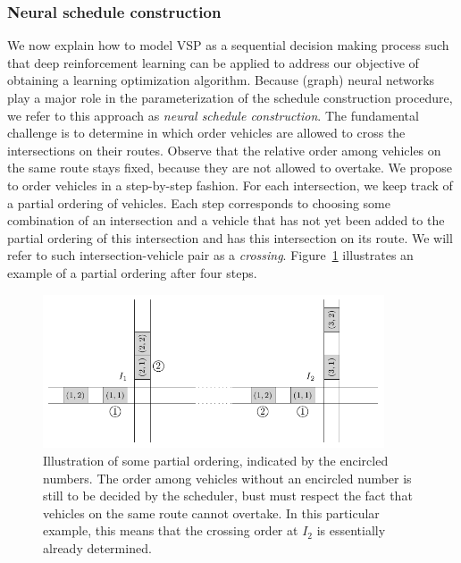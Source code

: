 \documentclass{article}
\theoremstyle{definition}
\theoremstyle{plain}
\begin{document}
\subsubsection{Neural schedule construction}
\label{sec:constructive_neural}

We now explain how to model VSP as a sequential decision making process such
that deep reinforcement learning can be applied to address our objective of
obtaining a learning optimization algorithm.
Because (graph) neural networks play a major role in the parameterization of the schedule construction procedure, we refer to this approach as \textit{neural schedule construction}.
The fundamental challenge is to determine in which order
vehicles are allowed to cross the intersections on their routes. Observe that
the relative order among vehicles on the same route stays fixed, because they
are not allowed to overtake.
%
We propose to order vehicles in a step-by-step fashion. For each intersection,
we keep track of a partial ordering of vehicles. Each step corresponds to
choosing some combination of an intersection and a vehicle that has not yet been
added to the partial ordering of this intersection and has this intersection on
its route. We will refer to such intersection-vehicle pair as a \textit{crossing}.
Figure~\ref{fig:network_ordering} illustrates an example of a partial ordering after four steps.

\begin{figure}[h]
  \centering
  \includegraphics[width=0.9\textwidth]{figures/network_ordering.pdf}
  \caption{Illustration of some partial ordering, indicated by the encircled
    numbers. The order among vehicles without an encircled number is still to be
    decided by the scheduler, bust must respect the fact that vehicles on the
    same route cannot overtake. In this particular example, this means that the
    crossing order at $I_{2}$ is essentially already determined.}
  \label{fig:network_ordering}
\end{figure}
\end{document}
